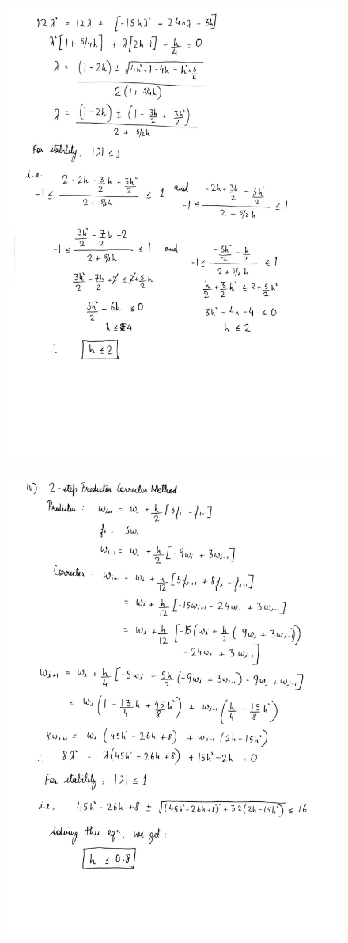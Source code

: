 \documentclass[12pt,letterpaper]{article}
\begin{document}
\begin{figure}[H]
\centering
\includegraphics[scale=0.55]{"../im3"}
\end{figure}


\begin{figure}[H]
\centering
\includegraphics[scale=0.55]{"../im4"}
\end{figure}
\end{document}
